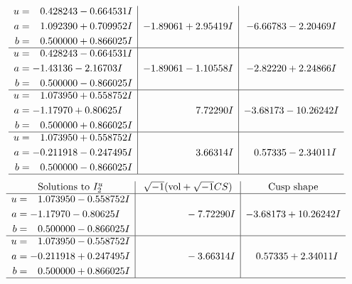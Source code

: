 \documentclass[1p]{elsarticle_modified}
\theoremstyle{definition}
\newcommand{\I}{\sqrt{-1}}
\begin{document}
$$\begin{array}{c|c|c}
\begin{aligned}
u &= \phantom{-}0.428243 - 0.664531 I \\
a &= \phantom{-}1.092390 + 0.709952 I \\
b &= \phantom{-}0.500000 + 0.866025 I\end{aligned}
 & -1.89061 + 2.95419 I & -6.66783 - 2.20469 I \\ \hline\begin{aligned}
u &= \phantom{-}0.428243 - 0.664531 I \\
a &= -1.43136 - 2.16703 I \\
b &= \phantom{-}0.500000 - 0.866025 I\end{aligned}
 & -1.89061 - 1.10558 I & -2.82220 + 2.24866 I \\ \hline\begin{aligned}
u &= \phantom{-}1.073950 + 0.558752 I \\
a &= -1.17970 + 0.80625 I \\
b &= \phantom{-}0.500000 + 0.866025 I\end{aligned}
 & \phantom{-0.000000 -}7.72290 I & -3.68173 - 10.26242 I \\ \hline\begin{aligned}
u &= \phantom{-}1.073950 + 0.558752 I \\
a &= -0.211918 - 0.247495 I \\
b &= \phantom{-}0.500000 - 0.866025 I\end{aligned}
 & \phantom{-0.000000 -}3.66314 I & \phantom{-}0.57335 - 2.34011 I\\
 \hline 
 \end{array}$$\newpage$$\begin{array}{c|c|c}  
\text{Solutions to }I^u_{2}& \I (\text{vol} + \sqrt{-1}CS) & \text{Cusp shape}\\
 \hline 
\begin{aligned}
u &= \phantom{-}1.073950 - 0.558752 I \\
a &= -1.17970 - 0.80625 I \\
b &= \phantom{-}0.500000 - 0.866025 I\end{aligned}
 & \phantom{-0.000000 } -7.72290 I & -3.68173 + 10.26242 I \\ \hline\begin{aligned}
u &= \phantom{-}1.073950 - 0.558752 I \\
a &= -0.211918 + 0.247495 I \\
b &= \phantom{-}0.500000 + 0.866025 I\end{aligned}
 & \phantom{-0.000000 } -3.66314 I & \phantom{-}0.57335 + 2.34011 I\\
 \hline 
 \end{array}$$\newpage\newpage\renewcommand{\arraystretch}{1}
\end{document}
